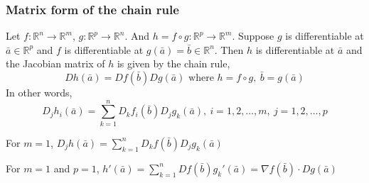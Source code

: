 \subsubsection{Matrix form of the chain rule}
Let $f : \mathbb{R}^n \to \mathbb{R}^m$, $g : \mathbb{R}^p \to \mathbb{R}^n$.
And $h = f \circ g : \mathbb{R}^p \to \mathbb{R}^m$.
Suppose $g$ is differentiable at $\bar{a} \in \mathbb{R}^p$ and $f$ is differentiable at $g(\bar{a}) = \bar{b} \in \mathbb{R}^n$.
Then $h$ is differentiable at $\bar{a}$ and the Jacobian matrix of $h$ is given by the chain rule,
\[ Dh(\bar{a}) = Df(\bar{b})Dg(\bar{a}) \text{ where } h = f \circ g,\ \bar{b} = g(\bar{a})\]
In other words,
\[ D_jh_i(\bar{a}) = \sum_{k=1}^n D_k f_i(\bar{b}) D_j g_k(\bar{a}),\ i=1,2,\dots,m,\ j=1,2,\dots,p \]

For $m=1$, $D_j h(\bar{a}) = \sum\limits_{k=1}^n D_kf(\bar{b}) D_jg_k(\bar{a})$

For $m=1$ and $p=1$, $h'(\bar{a}) = \sum\limits_{k=1}^n Df(\bar{b}) g_k'(\bar{a}) = \nabla f(\bar{b}) \cdot Dg(\bar{a})$

